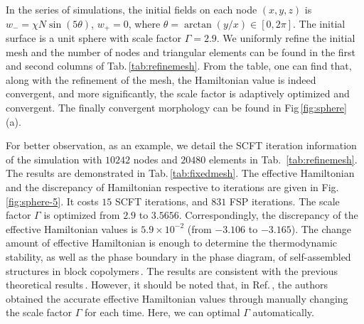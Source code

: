 \documentclass[final,1p,times]{elsarticle}
\begin{document}
In the series of simulations, the initial fields on each node $(x, y, z)$ is $
w_{-} = \chi N\sin(5\theta)$, $w_{+} = 0 $, where $\theta = \arctan(y/x) \in
[0, 2\pi]$.  The initial surface is a unit sphere with scale factor
$\Gamma=2.9$.  We uniformly refine the initial mesh and the number of nodes and
triangular elements can be found in the first and second columns of
Tab.\,\ref{tab:refinemesh}. From the table, one can find that, along with the
refinement of the mesh,  the Hamiltonian value is indeed convergent, and more
significantly, the scale factor is adaptively optimized and
convergent. The finally convergent morphology can be found in Fig\,\ref{fig:sphere} (a). 

For better observation, as an example, we detail the SCFT iteration information
of the simulation with $10242$ nodes and $20480$ elements in Tab.\,
\ref{tab:refinemesh}.   The results are demonstrated in
Tab.\,\ref{tab:fixedmesh}.  The effective Hamiltonian and the discrepancy of
Hamiltonian respective to iterations are given in Fig.\,\ref{fig:sphere-5}.
It costs $15$ SCFT iterations, and $831$ FSP iterations. The scale
factor $\Gamma$  is optimized from $2.9$ to $3.5656$.  Correspondingly, the
discrepancy of the effective Hamiltonian values is $5.9\times 10^{-2}$ (from
$-3.106$ to $-3.165$). The change amount of effective Hamiltonian is enough to
determine the thermodynamic stability, as well as the phase boundary in the
phase diagram, of self-assembled structures in block
copolymers\,\cite{chantawansri2007, fredrickson2006equilibrium,
matsen1994stable, jiang2013discovery}.  The results are consistent with the
previous theoretical results\,\cite{chantawansri2007}.  However, it should be
noted that, in Ref.\,\cite{chantawansri2007}, the authors
obtained the accurate effective Hamiltonian values through
manually changing the scale factor $\Gamma$ for each time. Here, we 
can optimal $\Gamma$ automatically. 
\end{document}
